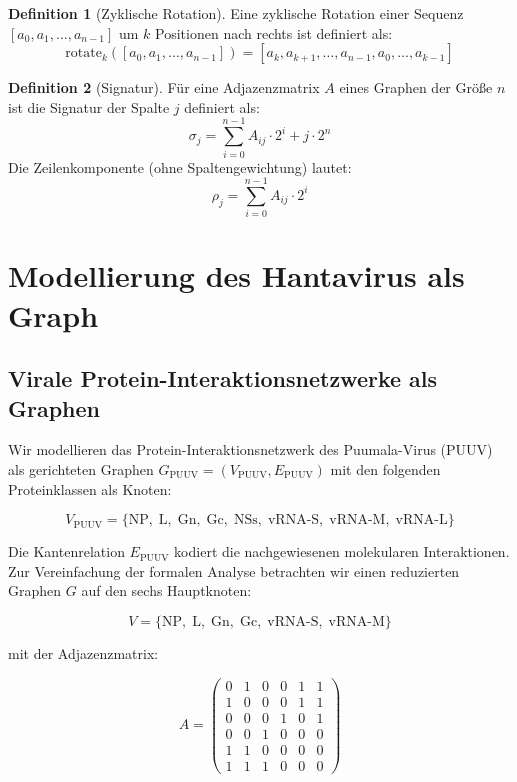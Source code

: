﻿\documentclass[a4paper,12pt]{article}
\theoremstyle{definition}
\newtheorem{definition}{Definition}
\begin{document}
\begin{definition}[Zyklische Rotation]
    Eine zyklische Rotation einer Sequenz $[a_0, a_1, \ldots, a_{n-1}]$
    um $k$ Positionen nach rechts ist definiert als:
    \[
        \mathrm{rotate}_k([a_0, a_1, \ldots, a_{n-1}]) =
        [a_k, a_{k+1}, \ldots, a_{n-1}, a_0, \ldots, a_{k-1}]
    \]
\end{definition}

\begin{definition}[Signatur]
    F\"ur eine Adjazenzmatrix $A$ eines Graphen der Gr\"o{\ss}e $n$ ist
    die Signatur der Spalte $j$ definiert als:
    \[
        \sigma_j = \sum_{i=0}^{n-1} A_{ij} \cdot 2^i + j \cdot 2^n
    \]
    Die Zeilenkomponente (ohne Spaltengewichtung) lautet:
    \[
        \rho_j = \sum_{i=0}^{n-1} A_{ij} \cdot 2^i
    \]
\end{definition}

\section{Modellierung des Hantavirus als Graph}
\label{sec:modellierung}

\subsection{Virale Protein-Interaktionsnetzwerke als Graphen}

Wir modellieren das Protein-Interaktionsnetzwerk des Puumala-Virus (PUUV)
als gerichteten Graphen $G_{\mathrm{PUUV}} = (V_{\mathrm{PUUV}}, E_{\mathrm{PUUV}})$
mit den folgenden Proteinklassen als Knoten:

\[
    V_{\mathrm{PUUV}} = \{\mathrm{NP},\; \mathrm{L},\; \mathrm{Gn},\; \mathrm{Gc},\;
    \mathrm{NSs},\; \mathrm{vRNA\text{-}S},\; \mathrm{vRNA\text{-}M},\; \mathrm{vRNA\text{-}L}\}
\]

Die Kantenrelation $E_{\mathrm{PUUV}}$ kodiert die nachgewiesenen
molekularen Interaktionen. Zur Vereinfachung der formalen Analyse
betrachten wir einen reduzierten Graphen $G$ auf den sechs
Hauptknoten:

\[
    V = \{\mathrm{NP},\; \mathrm{L},\; \mathrm{Gn},\; \mathrm{Gc},\;
    \mathrm{vRNA\text{-}S},\; \mathrm{vRNA\text{-}M}\}
\]

mit der Adjazenzmatrix:

\[
    A = \begin{pmatrix}
        0 & 1 & 0 & 0 & 1 & 1 \\
        1 & 0 & 0 & 0 & 1 & 1 \\
        0 & 0 & 0 & 1 & 0 & 1 \\
        0 & 0 & 1 & 0 & 0 & 0 \\
        1 & 1 & 0 & 0 & 0 & 0 \\
        1 & 1 & 1 & 0 & 0 & 0
    \end{pmatrix}
\]
\end{document}
